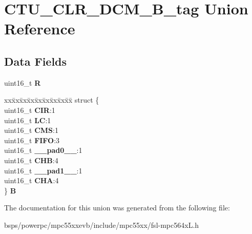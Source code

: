 \hypertarget{unionCTU__CLR__DCM__16B__tag}{}\section{C\+T\+U\+\_\+\+C\+L\+R\+\_\+\+D\+C\+M\+\_\+B\+\_\+tag Union Reference}
\label{unionCTU__CLR__DCM__16B__tag}
\subsection*{Data Fields}
\begin{DoxyCompactItemize}
\item 
\mbox{\label{unionCTU__CLR__DCM__16B__tag_a44c513f3f00ff591d8dd2c2c5267f573}} 
uint16\+\_\+t {\bfseries R}
\item 
\mbox{\label{unionCTU__CLR__DCM__16B__tag_ab97824e731f02fadfaf58e2ecdd56c7c}} 
\begin{tabbing}
xx\=xx\=xx\=xx\=xx\=xx\=xx\=xx\=xx\=\kill
struct \{\\
\>uint16\_t {\bfseries CIR}:1\\
\>uint16\_t {\bfseries LC}:1\\
\>uint16\_t {\bfseries CMS}:1\\
\>uint16\_t {\bfseries FIFO}:3\\
\>uint16\_t {\bfseries \_\_pad0\_\_}:1\\
\>uint16\_t {\bfseries CHB}:4\\
\>uint16\_t {\bfseries \_\_pad1\_\_}:1\\
\>uint16\_t {\bfseries CHA}:4\\
\} {\bfseries B}\\

\end{tabbing}\end{DoxyCompactItemize}


The documentation for this union was generated from the following file\+:\begin{DoxyCompactItemize}
\item 
bsps/powerpc/mpc55xxevb/include/mpc55xx/fsl-\/mpc564x\+L.\+h\end{DoxyCompactItemize}
